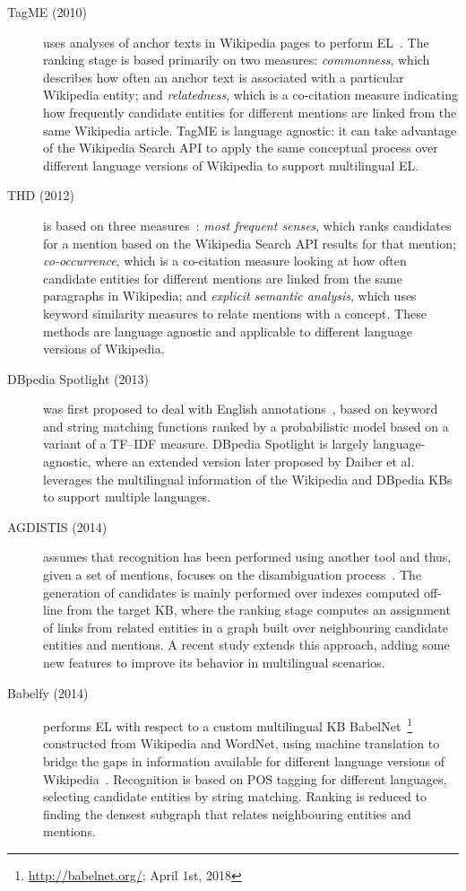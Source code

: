 \documentclass{llncs}
\begin{document}
\begin{description}
\item[TagME (2010)] uses analyses of anchor texts in Wikipedia pages to perform EL~\cite{ferragina2010tagme}. The ranking stage is based primarily on two measures: \textit{commonness}, which describes how often an anchor text is associated with a particular Wikipedia entity; and \textit{relatedness}, which is a co-citation measure indicating how frequently candidate entities for different mentions are linked from the same Wikipedia article. TagME is language agnostic: it can take advantage of the Wikipedia Search API to apply the same conceptual process over different language versions of Wikipedia to support multilingual EL.
\item[THD (2012)] is based on three measures~\cite{THD-dojchinovski2012recognizing}: \textit{most frequent senses}, which ranks candidates for a mention based on the Wikipedia Search API results for that mention; \textit{co-occurrence}, which is a co-citation measure looking at how often candidate entities for different mentions are linked from the same paragraphs in Wikipedia; and \textit{explicit semantic analysis}, which uses keyword similarity measures to relate mentions with a concept. These methods are language agnostic and applicable to different language versions of Wikipedia.
\item[DBpedia Spotlight (2013)] was first proposed to deal with English annotations~\cite{mendes2011dbpedia}, based on keyword and string matching functions ranked by a probabilistic model based on a variant of a TF--IDF measure. DBpedia Spotlight is largely language-agnostic, where an extended version later proposed by Daiber et al.~\cite{daiber2013improving} leverages the multilingual information of the Wikipedia and DBpedia KBs to support multiple languages.
\item[AGDISTIS (2014)] assumes that recognition has been performed using another tool and thus, given a set of mentions, focuses on the disambiguation process~\cite{usbeck2014agdistis}. The generation of candidates is mainly performed over indexes computed off-line from the target KB, where the ranking stage computes an assignment of links from related entities in a graph built over neighbouring candidate entities and mentions. A recent study \cite{mag2017} extends this approach, adding some new features to improve its behavior in multilingual scenarios. 
\item[Babelfy (2014)] performs EL with respect to a custom multilingual KB BabelNet~\footnote{\url{http://babelnet.org/}; April 1st, 2018} constructed from Wikipedia and WordNet, using machine translation to bridge the gaps in information available for different language versions of Wikipedia~\cite{Babelfy-moro2014entity}. Recognition is based on POS tagging for different languages, selecting candidate entities by string matching. Ranking is reduced to finding the densest subgraph that relates neighbouring entities and mentions.

\end{description}
\end{document}
